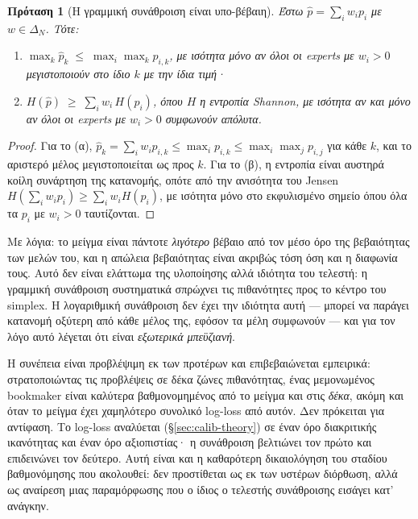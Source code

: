 \documentclass[12pt,a4paper,oneside]{report}
\renewcommand{\_}{\oldunderscore\allowbreak}
\theoremstyle{definition}
\theoremstyle{plain}
\newtheorem{proposition}[theorem]{Πρόταση}
\theoremstyle{remark}
\begin{document}
\begin{proposition}[Η γραμμική συνάθροιση είναι υπο-βέβαιη]
\label{prop:pooling-shrinks}
Έστω $\hat{p} = \sum_i w_i p_i$ με $w \in \Delta_N$. Τότε:
\begin{enumerate}[label=(\alph*),topsep=3pt]
  \item $\max_k \hat{p}_k \;\leq\; \max_i \max_k p_{i,k}$, με ισότητα μόνο αν όλοι οι experts
        με $w_i>0$ μεγιστοποιούν στο ίδιο $k$ με την ίδια τιμή·
  \item $H(\hat{p}) \;\geq\; \sum_i w_i\, H(p_i)$, όπου $H$ η εντροπία Shannon, με ισότητα αν
        και μόνο αν όλοι οι experts με $w_i>0$ συμφωνούν απόλυτα.
\end{enumerate}
\end{proposition}

\begin{proof}
Για το (α), $\hat{p}_k = \sum_i w_i p_{i,k} \leq \max_i p_{i,k} \leq \max_i\max_j p_{i,j}$ για
κάθε $k$, και το αριστερό μέλος μεγιστοποιείται ως προς $k$. Για το (β), η εντροπία είναι
αυστηρά κοίλη συνάρτηση της κατανομής, οπότε από την ανισότητα του Jensen
$H(\sum_i w_i p_i) \geq \sum_i w_i H(p_i)$, με ισότητα μόνο στο εκφυλισμένο σημείο όπου όλα
τα $p_i$ με $w_i>0$ ταυτίζονται.
\end{proof}

Με λόγια: το μείγμα είναι πάντοτε \emph{λιγότερο} βέβαιο από τον μέσο όρο της βεβαιότητας των
μελών του, και η απώλεια βεβαιότητας είναι ακριβώς τόση όση και η διαφωνία τους. Αυτό δεν
είναι ελάττωμα της υλοποίησης αλλά ιδιότητα του τελεστή: η γραμμική συνάθροιση συστηματικά
σπρώχνει τις πιθανότητες προς το κέντρο του simplex. Η λογαριθμική συνάθροιση δεν έχει την
ιδιότητα αυτή --- μπορεί να παράγει κατανομή οξύτερη από κάθε μέλος της, εφόσον τα μέλη
συμφωνούν --- και για τον λόγο αυτό λέγεται ότι είναι \emph{εξωτερικά μπεϋζιανή}.

Η συνέπεια είναι προβλέψιμη εκ των προτέρων και επιβεβαιώνεται εμπειρικά: στρατοποιώντας τις
προβλέψεις σε δέκα ζώνες πιθανότητας, ένας μεμονωμένος bookmaker είναι καλύτερα
βαθμονομημένος από το μείγμα και στις \emph{δέκα}, ακόμη και όταν το μείγμα έχει χαμηλότερο
συνολικό log-loss από αυτόν. Δεν
πρόκειται για αντίφαση. Το log-loss αναλύεται (\S\ref{sec:calib-theory}) σε έναν όρο
διακριτικής ικανότητας και έναν όρο αξιοπιστίας· η συνάθροιση βελτιώνει τον πρώτο και
επιδεινώνει τον δεύτερο. Αυτή είναι και η καθαρότερη δικαιολόγηση του σταδίου βαθμονόμησης
που ακολουθεί: δεν προστίθεται ως εκ των υστέρων διόρθωση, αλλά ως αναίρεση μιας
παραμόρφωσης που ο ίδιος ο τελεστής συνάθροισης εισάγει κατ' ανάγκην.
\end{document}
